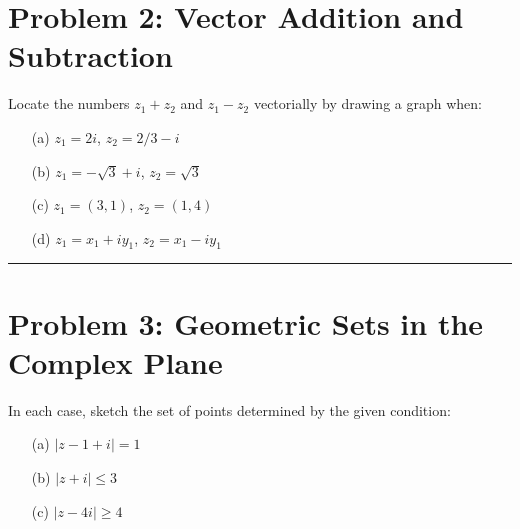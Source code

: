 \documentclass{article}
\begin{document}
\newpage
\section*{Problem 2: Vector Addition and Subtraction}
Locate the numbers $z_1+z_2$ and $z_1 - z_2$ vectorially by drawing a graph when:

\begin{enumerate}
    \item[(a)] $z_1 = 2i$, $z_2 = 2/3-i$
    
    \vspace{.5cm} %
    
    \item[(b)] $z_1 = -\sqrt{3}+i$, $z_2 = \sqrt{3}$
    
    \vspace{.5cm} %
    
    \item[(c)] $z_1 = (3,1)$, $z_2 = (1,4)$
    
    \vspace{.5cm} %
    
    \item[(d)] $z_1 = x_1+iy_1$, $z_2 = x_1-iy_1$
    
    \vspace{.5cm} %
\end{enumerate}

\hrule

\newpage
\section*{Problem 3: Geometric Sets in the Complex Plane}
In each case, sketch the set of points determined by the given condition:

\begin{enumerate}
    \item[(a)] $|z-1+i|=1$
    
    \vspace{.5cm} %
    
    \item[(b)] $|z+i| \leq 3$
    
    \vspace{.5cm} %
    
    \item[(c)] $|z-4i|\geq4$
    
    \vspace{.5cm} %
\end{enumerate}
\end{document}
